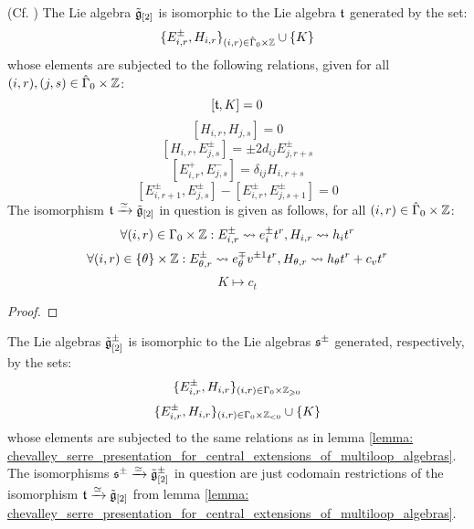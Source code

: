             \begin{lemma} \label{lemma: chevalley_serre_presentation_for_central_extensions_of_multiloop_algebras}
                (Cf. \cite[Proposition 6.6]{wendlandt_formal_shift_operators_on_yangian_doubles}) The Lie algebra $\tilde{\mathfrak{g}}_{[2]}$ is isomorphic to the Lie algebra $\mathfrak{t}$ generated by the set:
                    $$\{ E_{i, r}^{\pm}, H_{i, r} \}_{(i, r) \in \hat{\Gamma}_0 \x \Z} \cup \{ K \}$$
                whose elements are subjected to the following relations, given for all $(i, r), (j, s) \in \hat{\Gamma}_0 \x \Z$:
                    $$[\mathfrak{t}, K] = 0$$
                    $$[ H_{i, r}, H_{j, s} ] = 0$$
                    $$[ H_{i, r}, E_{j, s}^{\pm} ] = \pm 2 d_{ij} E_{j, r + s}^{\pm}$$
                    $$[ E_{i, r}^+, E_{j, s}^- ] = \delta_{ij} H_{i, r + s}$$
                    $$[ E_{i, r + 1}^{\pm}, E_{j, s}^{\pm} ] - [ E_{i, r}^{\pm}, E_{j, s + 1}^{\pm} ] = 0$$
                The isomorphism $\mathfrak{t} \xrightarrow[]{\simeq} \tilde{\mathfrak{g}}_{[2]}$ in question is given as follows, for all $(i, r) \in \hat{\Gamma}_0 \x \Z$:
                    $$\forall (i, r) \in \Gamma_0 \x \Z: E_{i, r}^{\pm} \mapsto e_i^{\pm} t^r, H_{i, r} \mapsto h_i t^r$$
                    $$\forall (i, r) \in \{\theta\} \x \Z: E_{\theta, r}^{\pm} \mapsto e_{\theta}^{\mp} v^{\pm 1} t^r, H_{\theta, r} \mapsto h_{\theta} t^r + c_v t^r$$
                    $$K \mapsto c_t$$
            \end{lemma}
                \begin{proof}
                    
                \end{proof}
            \begin{corollary} \label{coro: chevalley_serre_presentation_for_central_extensions_of_multiloop_algebras}
                The Lie algebras $\tilde{\mathfrak{g}}_{[2]}^{\pm}$ is isomorphic to the Lie algebras $\mathfrak{s}^{\pm}$ generated, respectively, by the sets:
                    $$\{ E_{i, r}^{\pm}, H_{i, r} \}_{(i, r) \in \Gamma_0 \x \Z_{\geq 0}}$$
                    $$\{ E_{i, r}^{\pm}, H_{i, r} \}_{(i, r) \in \Gamma_0 \x \Z_{< 0}} \cup \{K\}$$
                whose elements are subjected to the same relations as in lemma \ref{lemma: chevalley_serre_presentation_for_central_extensions_of_multiloop_algebras}. The isomorphisms $\mathfrak{s}^{\pm} \xrightarrow[]{\simeq} \tilde{\mathfrak{g}}_{[2]}^{\pm}$ in question are just codomain restrictions of the isomorphism $\mathfrak{t} \xrightarrow[]{\simeq} \tilde{\mathfrak{g}}_{[2]}$ from lemma \ref{lemma: chevalley_serre_presentation_for_central_extensions_of_multiloop_algebras}.
            \end{corollary}
            
